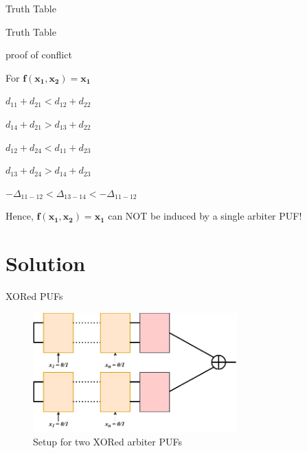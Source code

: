 \documentclass[10pt, compress]{beamer}
\begin{document}
\begin{frame}{Truth Table}
  
\end{frame}

\begin{frame}{Truth Table}
  
\end{frame}


\begin{frame}{proof of conflict}
    \begin{center}
        For $\mathbf{f(x_1, x_2) = x_1}$
        
        \vspace{0,5cm}
    
        $d_{11} + d_{21} < d_{12} + d_{22}$
        
        $d_{14} + d_{21} > d_{13} + d_{22}$
        
        $d_{12} + d_{24} < d_{11} + d_{23}$
        
        $d_{13} + d_{24} > d_{14} + d_{23}$
        
        \vspace{0.5cm}

        $-\Delta_{11-12} < \Delta_{13-14} < -\Delta_{11-12}$
        
        \vspace{0.5cm}
        
        Hence, $\mathbf{f(x_1, x_2) = x_1}$ can NOT be induced by a single arbiter PUF!
    \end{center}
\end{frame}

\section{Solution}

\begin{frame}{XORed PUFs}
    \begin{figure}
        \centering
        \includegraphics[width=0.7\textwidth]{figures/puf_2_xor.pdf}
        \caption{Setup for two XORed arbiter PUFs}
    \end{figure}
\end{frame}
\end{document}
